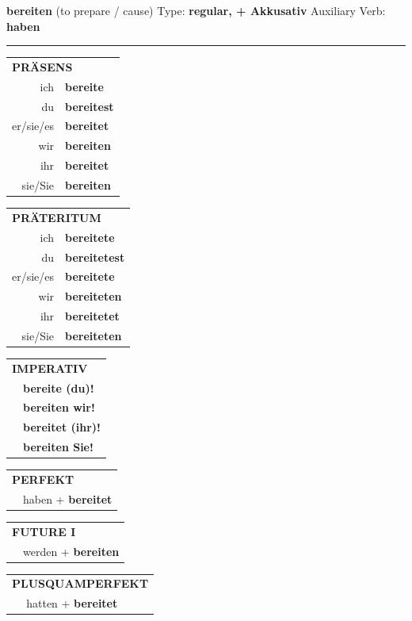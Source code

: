 \documentclass[10pt,a4paper]{revtex4-2}
\begin{document}
\begin{verbbox-acc}
{\Large \bf bereiten} (to prepare / cause) \hfill Type: \textbf{regular, + Akkusativ} \hfill Auxiliary Verb: \textbf{haben}

\vspace{5pt}
\hrule
\vspace{5pt}

\begin{tabular}{rl}
\multicolumn{2}{l}{\textbf{PRÄSENS}}\\
ich & \textbf{bereite}\\
du & \textbf{bereitest}\\
er/sie/es & \textbf{bereitet}\\
wir & \textbf{bereiten}\\
ihr & \textbf{bereitet}\\
sie/Sie & \textbf{bereiten}\\
\end{tabular}
\hfill
\begin{tabular}{rl}
\multicolumn{2}{l}{\textbf{PRÄTERITUM}}\\
ich & \textbf{bereitete}\\
du & \textbf{bereitetest}\\
er/sie/es & \textbf{bereitete}\\
wir & \textbf{bereiteten}\\
ihr & \textbf{bereitetet}\\
sie/Sie & \textbf{bereiteten}\\
\end{tabular}
\hfill
\begin{tabular}{rl}
\multicolumn{2}{l}{\textbf{IMPERATIV}}\\
& \textbf{bereite (du)!}\\
& \textbf{bereiten wir!}\\
& \textbf{bereitet (ihr)!}\\
& \textbf{bereiten Sie!}\\
\end{tabular}

\vspace{10pt}

\begin{tabular}{rl}
\multicolumn{2}{l}{\textbf{PERFEKT}}\\
& haben + \textbf{bereitet}\\
\end{tabular}
\hfill
\begin{tabular}{rl}
\multicolumn{2}{l}{\textbf{FUTURE I}}\\
& werden + \textbf{bereiten}\\
\end{tabular}
\hfill
\begin{tabular}{rl}
\multicolumn{2}{l}{\textbf{PLUSQUAMPERFEKT}}\\
& hatten + \textbf{bereitet}\\
\end{tabular}


\end{verbbox-acc}
\end{document}
